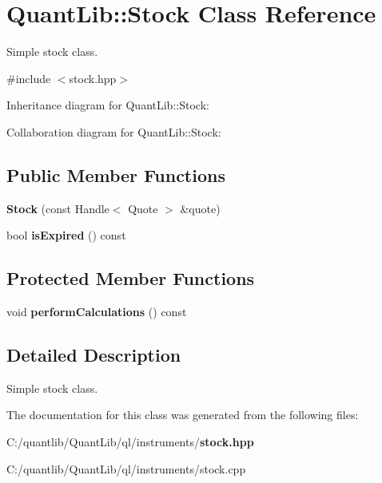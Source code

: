 \section{Quant\+Lib\+:\+:Stock Class Reference}
\label{class_quant_lib_1_1_stock}


Simple stock class.  




{\ttfamily \#include $<$stock.\+hpp$>$}



Inheritance diagram for Quant\+Lib\+:\+:Stock\+:


Collaboration diagram for Quant\+Lib\+:\+:Stock\+:
\subsection*{Public Member Functions}
\begin{DoxyCompactItemize}
\item 
{\bfseries Stock} (const Handle$<$ Quote $>$ \&quote)\label{class_quant_lib_1_1_stock_a415d9773ec4554361672987cf1edf15d}

\item 
bool {\bfseries is\+Expired} () const \label{class_quant_lib_1_1_stock_adc623259d13f26ad64d671a2533df904}

\end{DoxyCompactItemize}
\subsection*{Protected Member Functions}
\begin{DoxyCompactItemize}
\item 
void {\bfseries perform\+Calculations} () const \label{class_quant_lib_1_1_stock_a57712103227fd03c11b155a4d9e90777}

\end{DoxyCompactItemize}


\subsection{Detailed Description}
Simple stock class. 



The documentation for this class was generated from the following files\+:\begin{DoxyCompactItemize}
\item 
C\+:/quantlib/\+Quant\+Lib/ql/instruments/{\bf stock.\+hpp}\item 
C\+:/quantlib/\+Quant\+Lib/ql/instruments/stock.\+cpp\end{DoxyCompactItemize}
